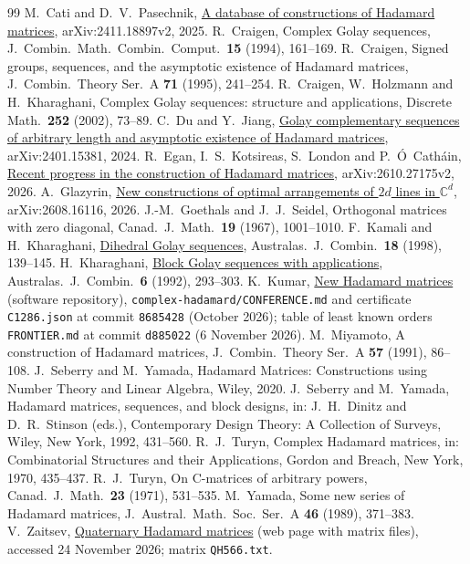 \documentclass[10pt]{article}
\theoremstyle{remark}
\begin{document}
\begin{thebibliography}{99}
 M.~Cati and D.~V.~Pasechnik, \href{https://arxiv.org/abs/2411.18897}{A database of constructions of Hadamard matrices}, arXiv:2411.18897v2, 2025.
 R.~Craigen, Complex Golay sequences, J.\ Combin.\ Math.\ Combin.\ Comput.\ \textbf{15} (1994), 161--169.
 R.~Craigen, Signed groups, sequences, and the asymptotic existence of Hadamard matrices, J.\ Combin.\ Theory Ser.\ A \textbf{71} (1995), 241--254.
 R.~Craigen, W.~Holzmann and H.~Kharaghani, Complex Golay sequences: structure and applications, Discrete Math.\ \textbf{252} (2002), 73--89.
 C.~Du and Y.~Jiang, \href{https://arxiv.org/abs/2401.15381}{Golay complementary sequences of arbitrary length and asymptotic existence of Hadamard matrices}, arXiv:2401.15381, 2024.
 R.~Egan, I.~S.~Kotsireas, S.~London and P.~\'O~Cath\'ain, \href{https://arxiv.org/abs/2610.27175}{Recent progress in the construction of Hadamard matrices}, arXiv:2610.27175v2, 2026.
 A.~Glazyrin, \href{https://arxiv.org/abs/2608.16116}{New constructions of optimal arrangements of $2d$ lines in $\mathbb C^d$}, arXiv:2608.16116, 2026.
 J.-M.~Goethals and J.~J.~Seidel, Orthogonal matrices with zero diagonal, Canad.\ J.\ Math.\ \textbf{19} (1967), 1001--1010.
 F.~Kamali and H.~Kharaghani, \href{https://ajc.maths.uq.edu.au/pdf/18/ocr-ajc-v18-p139.pdf}{Dihedral Golay sequences}, Australas.\ J.\ Combin.\ \textbf{18} (1998), 139--145.
 H.~Kharaghani, \href{https://ajc.maths.uq.edu.au/pdf/6/ocr-ajc-v6-p293.pdf}{Block Golay sequences with applications}, Australas.\ J.\ Combin.\ \textbf{6} (1992), 293--303.
 K.~Kumar, \href{https://github.com/vatskishan03/Hadamard}{New Hadamard matrices} (software repository), \texttt{complex-hadamard/CONFERENCE.md} and certificate \texttt{C1286.json} at commit \texttt{8685428} (October 2026); table of least known orders \texttt{FRONTIER.md} at commit \texttt{d885022} (6 November 2026).
 M.~Miyamoto, A construction of Hadamard matrices, J.\ Combin.\ Theory Ser.\ A \textbf{57} (1991), 86--108.
 J.~Seberry and M.~Yamada, Hadamard Matrices: Constructions using Number Theory and Linear Algebra, Wiley, 2020.
 J.~Seberry and M.~Yamada, Hadamard matrices, sequences, and block designs, in: J.~H.~Dinitz and D.~R.~Stinson (eds.), Contemporary Design Theory: A Collection of Surveys, Wiley, New York, 1992, 431--560.
 R.~J.~Turyn, Complex Hadamard matrices, in: Combinatorial Structures and their Applications, Gordon and Breach, New York, 1970, 435--437.
 R.~J.~Turyn, On C-matrices of arbitrary powers, Canad.\ J.\ Math.\ \textbf{23} (1971), 531--535.
 M.~Yamada, Some new series of Hadamard matrices, J.\ Austral.\ Math.\ Soc.\ Ser.\ A \textbf{46} (1989), 371--383.
 V.~Zaitsev, \href{https://www.cs.uleth.ca/~zaitsevv/quaternary.html}{Quaternary Hadamard matrices} (web page with matrix files), accessed 24 November 2026; matrix \texttt{QH566.txt}.
\end{thebibliography}
\end{document}

